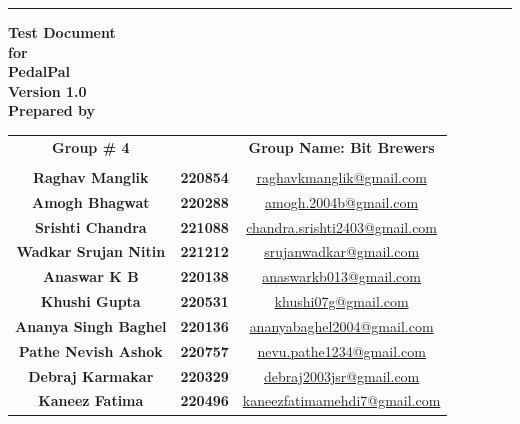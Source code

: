\documentclass[11pt]{article}
\begin{document}
\begin{titlingpage}
\begin{flushright}
    \rule{16cm}{5pt}\vskip1cm
    \textbf{{\fontsize{30}{36}\selectfont Test Document}\\ \vspace{1cm}\huge{for}\\\vspace{1cm}\Huge{PedalPal}\\ \vspace{1.5cm}\LARGE{Version 1.0}\\\vspace{1cm}\LARGE{Prepared by}}
\end{flushright}
\vspace{1.0cm}
\large{\begin{tabular*}{\columnwidth}{@{\extracolsep{\stretch{1}}}*{3}{c}@{}}
    \Large{\textbf{Group \# 4}} & & \Large{\textbf{Group Name: Bit Brewers}} \\
    \\
    \textbf{Raghav Manglik} & \textbf{220854} & \href{mailto:raghavkmanglik@gmail.com}{raghavkmanglik@gmail.com} \\
    \textbf{Amogh Bhagwat} & \textbf{220288} & \href{mailto:amogh.2004b@gmail.com}{amogh.2004b@gmail.com} \\
    \textbf{Srishti Chandra} & \textbf{221088} & \href{mailto:chandra.srishti2403@gmail.com}{chandra.srishti2403@gmail.com} \\
    \textbf{Wadkar Srujan Nitin} & \textbf{221212} & \href{mailto:srujanwadkar@gmail.com}{srujanwadkar@gmail.com} \\
    \textbf{Anaswar K B} & \textbf{220138} & \href{mailto:anaswarkb013@gmail.com}{anaswarkb013@gmail.com} \\
    \textbf{Khushi Gupta} & \textbf{220531} & \href{mailto:khushi07g@gmail.com}{khushi07g@gmail.com} \\
    \textbf{Ananya Singh Baghel} & \textbf{220136} & \href{mailto:ananyabaghel2004@gmail.com}{ananyabaghel2004@gmail.com} \\
    \textbf{Pathe Nevish Ashok} & \textbf{220757} & \href{mailto:nevu.pathe1234@gmail.com}{nevu.pathe1234@gmail.com} \\
    \textbf{Debraj Karmakar} & \textbf{220329} & \href{mailto:debraj2003jsr@gmail.com}{debraj2003jsr@gmail.com} \\
    \textbf{Kaneez Fatima} & \textbf{220496} & \href{mailto:kaneezfatimamehdi7@gmail.com}{kaneezfatimamehdi7@gmail.com} \\
    

\end{tabular*}}
\end{titlingpage}
\end{document}
